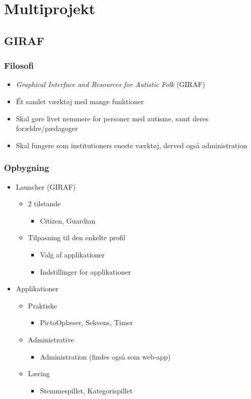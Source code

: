 \section{Multiprojekt}

\subsection{GIRAF}

\begin{frame}
\frametitle{Filosofi}

\begin{itemize}
\item \textit{Graphical Interface and Resources for Autistic Folk} (GIRAF)
\item Ét samlet værktøj med mange funktioner
\item Skal gøre livet nemmere for personer med autisme, samt deres forældre/pædagoger
\item Skal fungere som institutioners eneste værktøj, derved også administration
\end{itemize}

\end{frame}

\begin{frame}
\frametitle{Opbygning}

\begin{itemize}
\item Launcher (GIRAF)
\begin{itemize}
\item 2 tilstande
\begin{itemize}
\item Citizen, Guardian
\end{itemize}
\item Tilpasning til den enkelte profil
\begin{itemize}
\item Valg af applikationer
\item Indstillinger for applikationer
\end{itemize}
\end{itemize}
\item Applikationer
\begin{itemize}
\item Praktiske
\begin{itemize}
\item PictoOplæser, Sekvens, Timer
\end{itemize}
\item Administrative
\begin{itemize}
\item Administration (findes også som web-app)
\end{itemize}
\item Læring
\begin{itemize}
\item Stemmespillet, Kategorispillet
\end{itemize}
\end{itemize}
\end{itemize}

\end{frame}

